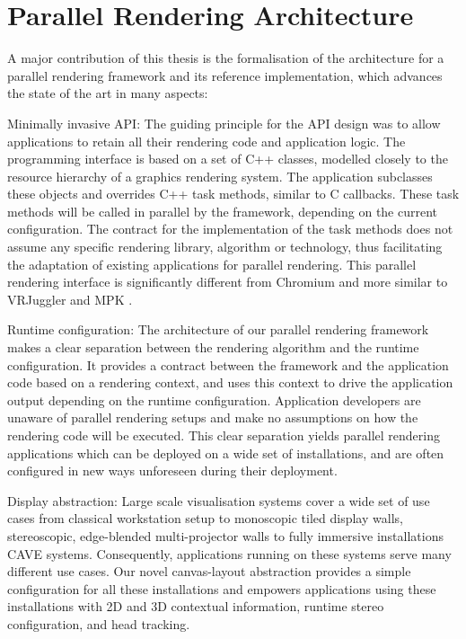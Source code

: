 \section{Parallel Rendering Architecture}

A major contribution of this thesis is the formalisation of the architecture for
a parallel rendering framework and its reference implementation, which advances
the state of the art in many aspects:

\begin{compactdesc}

\item[Minimally invasive API:] The guiding principle for the API design was to
allow applications to retain all their rendering code and application logic.
The programming interface is based on a set of C++ classes, modelled closely to
the resource hierarchy of a graphics rendering system. The application
subclasses these objects and overrides C++ task methods, similar to C
callbacks. These task methods will be called in parallel by the framework,
depending on the current configuration. The contract for the implementation of
the task methods does not assume any specific rendering library, algorithm or
technology, thus facilitating the adaptation of existing applications for
parallel rendering. This parallel rendering interface is significantly
different from Chromium \cite{HHNFAKK:02} and more similar to VRJuggler
\cite{BJHMBC:01} and MPK \cite{BRE:05}.

\item[Runtime configuration:] The architecture of our parallel rendering
framework makes a clear separation between the rendering algorithm and the runtime
configuration. It provides a contract between the framework and the application
code based on a rendering context, and uses this context to drive the
application output depending on the runtime configuration. Application
developers are unaware of parallel rendering setups and make no assumptions on
how the rendering code will be executed. This clear separation yields parallel
rendering applications which can be deployed on a wide set of installations,
and are often configured in new ways unforeseen during their deployment.

\item[Display abstraction:] Large scale visualisation systems cover a wide set
of use cases from classical workstation setup to monoscopic tiled display
walls, stereoscopic, edge-blended multi-projector walls to fully immersive
installations CAVE systems. Consequently, applications running on these
systems serve many different use cases. Our novel canvas-layout
abstraction provides a simple configuration for all these installations and
empowers applications using these installations with 2D and 3D contextual
information, runtime stereo configuration, and head tracking.


\end{compactdesc}
